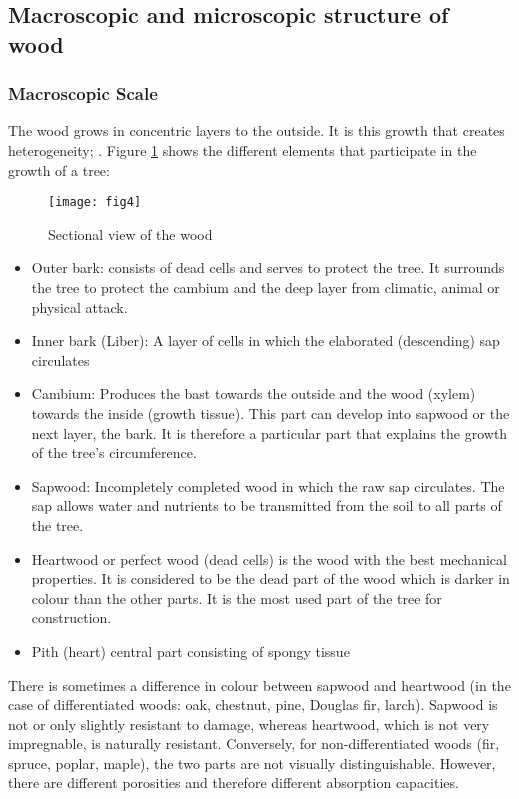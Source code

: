 \newpage

\subsection{Macroscopic and microscopic structure of wood}

\subsubsection{Macroscopic Scale}

The wood grows in concentric layers to the outside. It is this growth that creates heterogeneity; \cite{Seddik2006phd}. Figure \ref{fig:fig4} shows the different elements that participate in the growth of a tree:


\begin{figure}[htp]
	\centering
	\texttt{[image: fig4]}
	\caption{Sectional view of the wood}
	\label{fig:fig4}
\end{figure}

\begin{itemize}
	\item Outer bark: consists of dead cells and serves to protect the tree. It surrounds the tree to protect the cambium and the deep layer from climatic, animal or physical attack. 
	\item Inner bark (Liber): A layer of cells in which the elaborated (descending) sap circulates
	\item Cambium: Produces the bast towards the outside and the wood (xylem) towards the inside (growth tissue). This part can develop into sapwood or the next layer, the bark. It is therefore a particular part that explains the growth of the tree's circumference.
	\item Sapwood: Incompletely completed wood in which the raw sap circulates. The sap allows water and nutrients to be transmitted from the soil to all parts of the tree.
	\item Heartwood or perfect wood (dead cells) is the wood with the best mechanical properties. It is considered to be the dead part of the wood which is darker in colour than the other parts. It is the most used part of the tree for construction.
	\item Pith (heart) central part consisting of spongy tissue
\end{itemize}

There is sometimes a difference in colour between sapwood and heartwood (in the case of differentiated woods: oak, chestnut, pine, Douglas fir, larch). Sapwood is not or only slightly resistant to damage, whereas heartwood, which is not very impregnable, is naturally resistant. Conversely, for non-differentiated woods (fir, spruce, poplar, maple), the two parts are not visually distinguishable. However, there are different porosities and therefore different absorption capacities.


